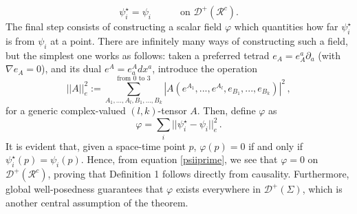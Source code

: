 \documentclass[a4paper, amsfonts, amssymb, amsmath, reprint, showkeys,  twoside, onecolumn,notitlepage,nofootinbib]{revtex4-1}
\newcommand{\spc}{\quad \quad \quad}
\theoremstyle{definition}
\theoremstyle{theorem}
\begin{document}
\begin{equation}\label{psiiprime}
\psi_i^\star = \psi_i  \spc \text{on }\mathcal{D}^+(\mathcal{R}^c).
\end{equation}
The final step consists of constructing a scalar field $\varphi$ which quantities how far $\psi_i^\star$ is from $\psi_i$ at a point. There are infinitely many ways of constructing such a field, but the simplest one works as follows: taken a preferred tetrad $e_A=e_A^a \partial_a$ (with $\nabla e_A=0$), and its dual $e^A=e^A_a dx^a$, introduce the operation
\begin{equation}
||A||_e^2 := \sum_{A_1,...,A_l,B_1,...,B_k}^{\text{from }0 \text{ to }3} |A(e^{A_1},...,e^{A_l},e_{B_1},...,e_{B_k})|^2 \, , 
\end{equation}
for a generic complex-valued $(l,k)$-tensor $A$. Then, define $\varphi$ as
\begin{equation}\label{piffuz}
\varphi =\sum_{i}  ||\psi_i^\star- \psi_i||_e^2 \, .
\end{equation}
It is evident that, given a space-time point $p$, $\varphi(p)=0$ if and only if $\psi_i^\star(p)=\psi_i(p)$. Hence, from equation \eqref{psiiprime}, we see that $\varphi=0$ on $\mathcal{D}^+(\mathcal{R}^c)$, proving that Definition 1 follows directly from causality. Furthermore, global well-posedness guarantees that $\varphi$ exists everywhere in $\mathcal{D}^+(\Sigma)$, which is another central assumption of the theorem. 

\end{document}

